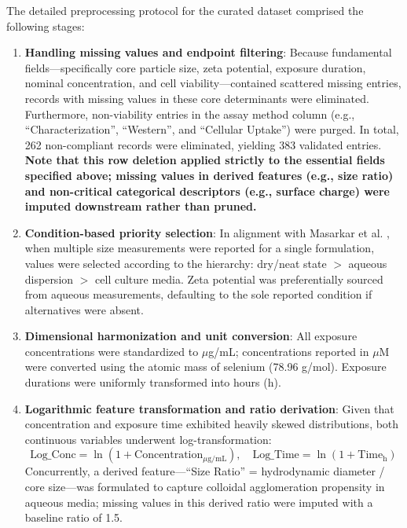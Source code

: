 The detailed preprocessing protocol for the curated dataset comprised the following stages:

\begin{enumerate}
  \item \textbf{Handling missing values and endpoint filtering}: Because fundamental fields—specifically core particle size, zeta potential, exposure duration, nominal concentration, and cell viability—contained scattered missing entries, records with missing values in these core determinants were eliminated. Furthermore, non-viability entries in the assay method column (e.g., ``Characterization'', ``Western'', and ``Cellular Uptake'') were purged. In total, 262 non-compliant records were eliminated, yielding 383 validated entries.
  \textbf{Note that this row deletion applied strictly to the essential fields specified above; missing values in derived features (e.g., size ratio) and non-critical categorical descriptors (e.g., surface charge) were imputed downstream rather than pruned.}

  \item \textbf{Condition-based priority selection}: In alignment with Masarkar et al. \cite{masarkar2024}, when multiple size measurements were reported for a single formulation, values were selected according to the hierarchy: dry/neat state $>$ aqueous dispersion $>$ cell culture media. Zeta potential was preferentially sourced from aqueous measurements, defaulting to the sole reported condition if alternatives were absent.

  \item \textbf{Dimensional harmonization and unit conversion}: All exposure concentrations were standardized to $\mu$g/mL; concentrations reported in $\mu$M were converted using the atomic mass of selenium (78.96 g/mol). Exposure durations were uniformly transformed into hours (h).

  \item \textbf{Logarithmic feature transformation and ratio derivation}: Given that concentration and exposure time exhibited heavily skewed distributions, both continuous variables underwent log-transformation:
        \[
          \text{Log\_Conc} = \ln(1 + \text{Concentration}_{\mu\text{g/mL}}), \quad
          \text{Log\_Time} = \ln(1 + \text{Time}_{\text{h}})
        \]
        Concurrently, a derived feature—``Size Ratio'' = hydrodynamic diameter / core size—was formulated to capture colloidal agglomeration propensity in aqueous media; missing values in this derived ratio were imputed with a baseline ratio of 1.5.


\end{enumerate}
